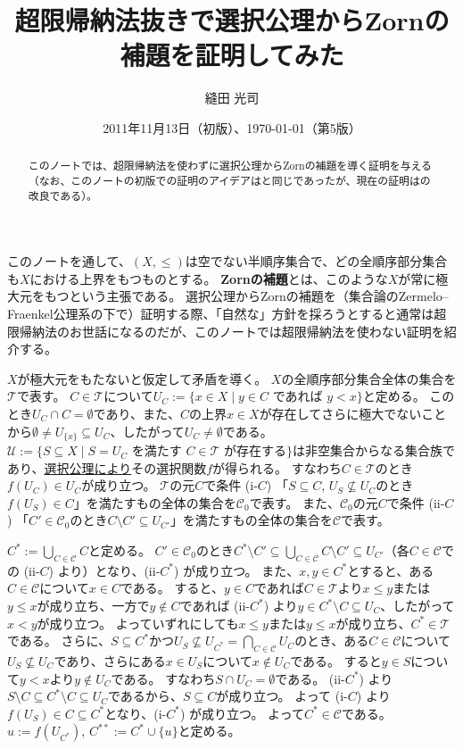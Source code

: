 ﻿\documentclass{ltjsarticle}
\title{超限帰納法抜きで選択公理からZornの補題を証明してみた}
\author{縫田 光司}
\date{2011年11月13日（初版）、\today （第5版）}
\theoremstyle{definition}
\begin{document}
\maketitle

\begin{abstract}
このノートでは、超限帰納法を使わずに選択公理からZornの補題を導く証明を与える（なお、このノートの初版での証明のアイデアは\cite[Theorem 4.19]{RubRub85}と同じであったが、現在の証明は\cite{Lewin91}の改良である）。
\end{abstract}

このノートを通して、$(X,\leq)$は空でない半順序集合で、どの全順序部分集合も$X$における上界をもつものとする。
\textbf{Zornの補題}とは、このような$X$が常に極大元をもつという主張である。
選択公理からZornの補題を（集合論のZermelo--Fraenkel公理系の下で）証明する際、「自然な」方針を採ろうとすると通常は超限帰納法のお世話になるのだが、このノートでは超限帰納法を使わない証明を紹介する。

$X$が極大元をもたないと仮定して矛盾を導く。
$X$の全順序部分集合全体の集合を$\mathcal{T}$で表す。
$C \in \mathcal{T}$について$U_C := \{ x \in X \mid y \in C \mbox{ であれば } y < x \}$と定める。
このとき$U_C \cap C = \emptyset$であり、また、$C$の上界$x \in X$が存在してさらに極大でないことから$\emptyset \neq U_{\{x\}} \subseteq U_C$、したがって$U_C \neq \emptyset$である。
$\mathcal{U} := \{ S \subseteq X \mid S = U_C \mbox{ を満たす } C \in \mathcal{T} \mbox{ が存在する} \}$は非空集合からなる集合族であり、\underline{選択公理により}その選択関数$f$が得られる。
すなわち$C \in \mathcal{T}$のとき$f(U_C) \in U_C$が成り立つ。
$\mathcal{T}$の元$C$で条件 (i-$C$) 「$S \subseteq C$, $U_S \not\subseteq U_C$のとき$f(U_S) \in C$」を満たすもの全体の集合を$\mathcal{C}_0$で表す。
また、$\mathcal{C}_0$の元$C$で条件 (ii-$C$) 「$C' \in \mathcal{C}_0$のとき$C \setminus C' \subseteq U_{C'}$」を満たすもの全体の集合を$\mathcal{C}$で表す。

$C^* := \bigcup_{C \in \mathcal{C}} C$と定める。
$C' \in \mathcal{C}_0$のとき$C^* \setminus C' \subseteq \bigcup_{C \in \mathcal{C}} C \setminus C' \subseteq U_{C'}$（各$C \in \mathcal{C}$での (ii-$C$) より）となり、(ii-$C^*$) が成り立つ。
また、$x,y \in C^*$とすると、ある$C \in \mathcal{C}$について$x \in C$である。
すると、$y \in C$であれば$C \in \mathcal{T}$より$x \leq y$または$y \leq x$が成り立ち、一方で$y \not\in C$であれば (ii-$C^*$) より$y \in C^* \setminus C \subseteq U_C$、したがって$x < y$が成り立つ。
よっていずれにしても$x \leq y$または$y \leq x$が成り立ち、$C^* \in \mathcal{T}$である。
さらに、$S \subseteq C^*$かつ$U_S \not\subseteq U_{C^*} = \bigcap_{C \in \mathcal{C}} U_C$のとき、ある$C \in \mathcal{C}$について$U_S \not\subseteq U_C$であり、さらにある$x \in U_S$について$x \not\in U_C$である。
すると$y \in S$について$y < x$より$y \not\in U_C$である。
すなわち$S \cap U_C = \emptyset$である。
(ii-$C^*$) より$S \setminus C \subseteq C^* \setminus C \subseteq U_C$であるから、$S \subseteq C$が成り立つ。
よって (i-$C$) より$f(U_S) \in C \subseteq C^*$となり、(i-$C^*$) が成り立つ。
よって$C^* \in \mathcal{C}$である。
$u := f(U_{C^*})$, $C^{**} := C^* \cup \{u\}$と定める。
\end{document}
